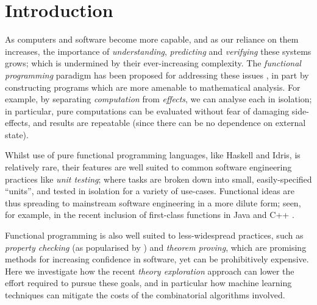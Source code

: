 \section{Introduction}

\iffalse
TODO
Intro + motivation

About 2 pages

Haskell is a mainstream FP language (motivation)

QuickCheck (example)

How to come up with the properties

Mention theory exploration
\fi

\iffalse TODO: sounds strange... what does it mean for software to be capable or uncapable? of what? Rephrase? \fi As computers and software become more capable, and as our reliance on them increases, the importance of \emph{understanding}, \emph{predicting} and \emph{verifying} these systems grows; which is undermined by their ever-increasing complexity. The \emph{functional programming} paradigm has been proposed for addressing these issues \cite{hughes1989functional}, in part by constructing programs which are more amenable to mathematical analysis. \iffalse TODO: I am not sure the example makes sense without explaining what effects are and why separating them helps. Rather than going there, perhaps just say about declarative style of programming and types expressing prperties of computations? \fi For example, by separating \emph{computation} from \emph{effects}, we can analyse each in isolation; in particular, pure computations can be evaluated without fear of damaging side-effects, and results are repeatable (since there can be no dependence on external state).

Whilst use of pure functional programming languages, like Haskell and Idris, is relatively rare, their features are well suited to common software engineering practices like \emph{unit testing}; where tasks are broken down into small, easily-specified ``units'', and tested in isolation for a variety of use-cases. Functional ideas are thus spreading to mainstream software engineering in a more dilute form; seen, for example, in the recent inclusion of first-class functions in Java \cite{gosling2015java} and C++ \cite{willcock2006lambda}.

Functional programming is also well suited to less-widespread practices, such as \emph{property checking} (as popularised by \qcheck{}) and \emph{theorem proving}, which are promising methods for increasing confidence in software, yet can be prohibitively expensive. Here we investigate how the recent \emph{theory exploration} approach can lower the effort required to pursue these goals, and in particular how machine learning techniques can mitigate the costs of the combinatorial algorithms involved.

